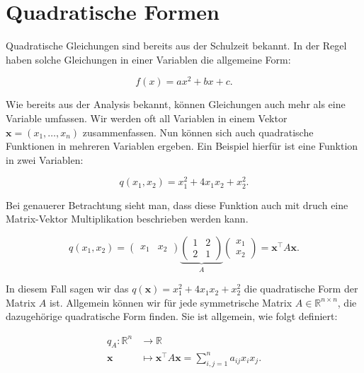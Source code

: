 \setcounter{section}{6}
\section{Quadratische Formen}

Quadratische Gleichungen sind bereits aus der Schulzeit bekannt. In der Regel haben solche Gleichungen in einer Variablen die allgemeine Form:

\begin{equation*}
    f(x) = ax^2 + bx + c.
\end{equation*}

Wie bereits aus der Analysis bekannt, können Gleichungen auch mehr als eine Variable umfassen. Wir werden oft all Variablen in einem Vektor \( \mathbf{x} = (x_1, \dots, x_n) \) zusammenfassen. Nun können sich auch quadratische Funktionen in mehreren Variablen ergeben. Ein Beispiel hierfür ist eine Funktion in zwei Variablen:

\begin{equation*}
    q(x_1,x_2) = x_1^2 + 4x_1x_2 + x_2^2.
\end{equation*}

Bei genauerer Betrachtung sieht man, dass diese Funktion auch mit druch eine Matrix-Vektor Multiplikation beschrieben werden kann. 

\begin{equation*}
    q(x_1, x_2) = \begin{pmatrix} x_1 & x_2 \end{pmatrix} \underbrace{\begin{pmatrix} 1 & 2 \\ 2 & 1 \end{pmatrix}}_{A} \begin{pmatrix} x_1 \\ x_2 \end{pmatrix} = \mathbf{x}^\top A \mathbf{x}.
\end{equation*}

In diesem Fall sagen wir das \( q(\mathbf{x}) = x_1^2 + 4x_1x_2 + x_2^2 \) die quadratische Form der Matrix \( A \) ist. Allgemein können wir für jede symmetrische Matrix \( A \in \mathbb{R}^{n \times n} \), die dazugehörige quadratische Form finden. Sie ist allgemein, wie folgt definiert:

\begin{equation*}
    \begin{aligned}
        q_A: \mathbb{R}^n &\longrightarrow \mathbb{R} \\
        \mathbf{x} &\longmapsto \mathbf{x}^\top A \mathbf{x} = \sum_{i,j=1}^{n} a_{ij}x_i x_j.
    \end{aligned}
\end{equation*}

